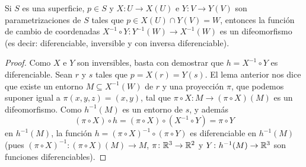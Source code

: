 \begin{proposition}
	\label{pro:cambio_de_coordenadas}
	Si $S$ es una superficie, $p\in S$ y $X\colon U\to X(U)$ e $Y\colon V\to
	Y(V)$ son parametrizaciones de $S$ tales que $p\in X(U)\cap Y(V)=W$,
	entonces la función de cambio de coordenadas $X^{-1}\circ Y\colon
	Y^{-1}(W)\to X^{-1}(W)$ es un difeomorfismo (es decir: diferenciable, inversible y con inversa
	diferenciable).  
\end{proposition}

\begin{proof}
	Como $X$ e $Y$ son inversibles, basta con demostrar que $h=X^{-1}\circ Y$ es diferenciable. 
	Sean $r$ y $s$ tales que $p=X(r)=Y(s)$. El lema anterior
	nos dice que existe un entorno $M\subseteq X^{-1}(W)$ de $r$ y una proyección $\pi$, que podemos suponer 
	igual a $\pi(x,y,z)=(x,y)$, tal que $\pi\circ X\colon M\to (\pi\circ X)(M)$ es un difeomorfismo. Como $h^{-1}(M)$ es un entorno de $s$, 
	y además 
	\[
		(\pi\circ X)\circ h=(\pi\circ X)\circ (X^{-1}\circ Y)=\pi\circ Y
	\]
	en $h^{-1}(M)$, la función $h=(\pi\circ X)^{-1}\circ (\pi\circ Y)$ es
	diferenciable en $h^{-1}(M)$ (pues $(\pi\circ X)^{-1}\colon (\pi\circ
	X)(M)\to M$, $\pi\colon\mathbb{R}^3\to\mathbb{R}^2$ y $Y\colon h^{-1}(M)\to\mathbb{R}^3$ son
	funciones diferenciables).
\end{proof}



